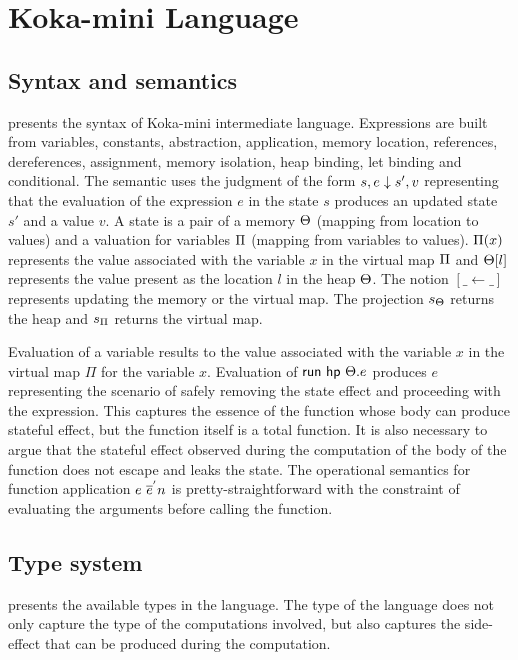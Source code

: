 \section{Koka-mini Language}
\subsection{Syntax and semantics}

 presents the syntax of Koka-mini intermediate language. Expressions are built from variables, constants, abstraction, application, memory location, references, dereferences, assignment, memory isolation, heap binding, let binding and conditional. The semantic uses the judgment of the form $s,e \downarrow s',v$ representing that the evaluation of the expression $e$ in the state $s$ produces an updated state $s'$ and a value $v$.
A state is a pair of a memory $\Theta$ (mapping from location to values) and a valuation for variables $\Pi$ (mapping from variables to values). $\Pi(x)$ represents the value associated with the variable $x$ in the virtual map $\Pi$ and $\Theta[l]$ represents the value present as the location $l$ in the heap $\Theta$. The notion $[\_ \leftarrow \_]$ represents updating the memory or the virtual map. The projection $s_{\Theta}$ returns the heap and $s_{\Pi}$ returns the virtual map.

Evaluation of a variable results to the value associated with the variable $x$ in the virtual map $\Pi$ for the variable $x$. 
Evaluation of ${\mathsf{run}}\ {{\mathsf{hp}}\ {\Theta}.{e}}$ produces $e$ representing the scenario of safely removing the state effect and proceeding with the expression. This captures the essence of the function whose body can produce stateful effect, but the function itself is a total function. It is also necessary to argue that the stateful effect observed during the computation of the body of the function does not escape and leaks the state. 
The operational semantics for function application $e \ \overline{e}^{'} n$ is pretty-straightforward with the constraint of evaluating the arguments before calling the function.



\subsection{Type system}

 presents the available types in the language. The type of the language does not only capture the type of the computations involved, but also captures the side-effect that can be produced during the computation.

